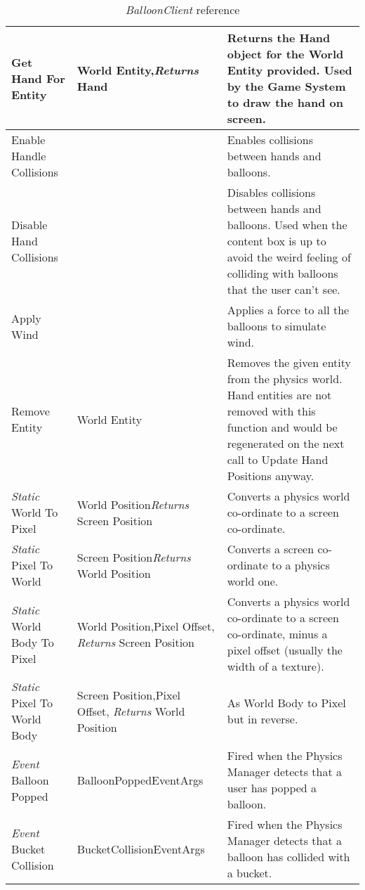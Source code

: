 \begin{table}[H]
\begin{longtable}{|p{4.5cm}|p{3.5cm}|p{7.7cm}|}
Get Hand For Entity & World Entity,\newline \emph{Returns} Hand &
Returns the Hand object for the World Entity provided. Used by the Game System
to draw the hand on screen. \\ \hline

Enable Handle Collisions & &
Enables collisions between hands and balloons. \\ \hline

Disable Hand Collisions & &
Disables collisions between hands and balloons. Used when the content box is 
up to avoid the weird feeling of colliding with balloons that the user can't 
see. \\ \hline

Apply Wind & & 
Applies a force to all the balloons to simulate wind. \\ \hline

Remove Entity & World Entity &
Removes the given entity from the physics world. Hand entities are not removed
with this function and would be regenerated on the next call to Update Hand 
Positions anyway. \\ \hline

\emph{Static} World To Pixel & World Position\newline \emph{Returns} Screen Position &
Converts a physics world co-ordinate to a screen co-ordinate.\\ \hline

\emph{Static} Pixel To World & Screen Position\newline \emph{Returns} World Position &
Converts a screen co-ordinate to a physics world one.\\ \hline

\emph{Static} World Body To Pixel & World Position,\newline Pixel Offset,\newline 
\emph{Returns} Screen Position &
Converts a physics world co-ordinate to a screen co-ordinate, minus a pixel 
offset (usually the width of a texture).\\ \hline

\emph{Static} Pixel To World Body & Screen Position,\newline Pixel Offset,\newline
\emph{Returns} World Position & 
As World Body to Pixel but in reverse.\\ \hline

\emph{Event} Balloon Popped & BalloonPopped\-EventArgs &
Fired when the Physics Manager detects that a user has popped a balloon.
\\ \hline

\emph{Event} Bucket Collision & BucketCollision\-EventArgs & 
Fired when the Physics Manager detects that a balloon has collided with a 
bucket.\\ \hline
\end{longtable}
\caption{\emph{BalloonClient} reference}

\label{BalloonClientRef}
\end{table}

